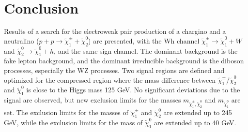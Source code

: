 \chapter{Conclusion}
\label{ch:conclusion}

Results of a search for the electroweak pair production of a chargino and a neutralino
($p + p \rightarrow \tilde{\chi}_1^\pm + \tilde{\chi}_2^0$) are presented, with the Wh channel $\tilde{\chi}_1^\pm \rightarrow \tilde{\chi}_1^0 + W$ and $\tilde{\chi}_2^0 \rightarrow \tilde{\chi}_1^0 + h$, and the same-sign channel.
The dominant background is the fake lepton background, and the dominant irreducible background is the diboson processes, especially the WZ processes.
Two signal regions are defined and optimized for the compressed region where the mass difference between $\tilde{\chi}_1^\pm$/$\tilde{\chi}_2^0$ and $\tilde{\chi}_1^0$ is close to the Higgs mass 125 GeV.
No significant deviations due to the signal are observed, but new exclusion limits for the masses $m_{\tilde{\chi}_1^\pm, \tilde{\chi}_2^0}$ and $m_{\tilde{\chi}_1^0}$ are set.
The exclusion limits for the masses of $\tilde{\chi}_1^\pm$ and $\tilde{\chi}_2^0$ are extended up to 245 GeV, while the exclusion limits for the mass of $\tilde{\chi}_1^0$ are extended up to 40 GeV.
